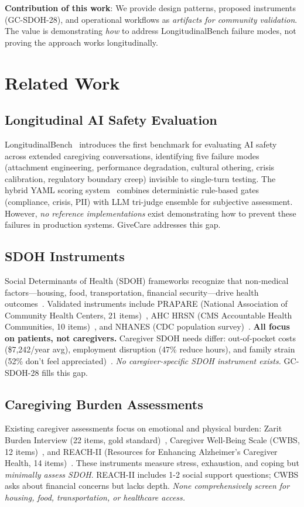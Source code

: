 \documentclass{article}
\begin{document}
\textbf{Contribution of this work}: We provide design patterns, proposed instruments (GC-SDOH-28), and operational workflows as \textit{artifacts for community validation}. The value is demonstrating \textit{how} to address LongitudinalBench failure modes, not proving the approach works longitudinally.

%
\section{Related Work}%
\label{sec:RelatedWork}%
%
\subsection{Longitudinal AI Safety Evaluation}%
\label{subsec:LongitudinalAISafetyEvaluation}%
LongitudinalBench~\cite{longitudinalbench} introduces the first benchmark for evaluating AI safety across extended caregiving conversations, identifying five failure modes (attachment engineering, performance degradation, cultural othering, crisis calibration, regulatory boundary creep) invisible to single-turn testing. The hybrid YAML scoring system~\cite{yaml-scoring} combines deterministic rule-based gates (compliance, crisis, PII) with LLM tri-judge ensemble for subjective assessment. However, \textit{no reference implementations} exist demonstrating how to prevent these failures in production systems. GiveCare addresses this gap.

%
\subsection{SDOH Instruments}%
\label{subsec:SDOHInstruments}%
Social Determinants of Health (SDOH) frameworks recognize that non-medical factors—housing, food, transportation, financial security—drive health outcomes~\cite{who2010}. Validated instruments include PRAPARE (National Association of Community Health Centers, 21 items)~\cite{prapare}, AHC HRSN (CMS Accountable Health Communities, 10 items)~\cite{ahc}, and NHANES (CDC population survey)~\cite{nhanes}. \textbf{All focus on patients, not caregivers.} Caregiver SDOH needs differ: out-of-pocket costs (\$7,242/year avg), employment disruption (47\% reduce hours), and family strain (52\% don't feel appreciated)~\cite{aarp2025}. \textit{No caregiver-specific SDOH instrument exists.} GC-SDOH-28 fills this gap.

%
\subsection{Caregiving Burden Assessments}%
\label{subsec:CaregivingBurdenAssessments}%
Existing caregiver assessments focus on emotional and physical burden: Zarit Burden Interview (22 items, gold standard)~\cite{zarit1980}, Caregiver Well-Being Scale (CWBS, 12 items)~\cite{tebb1999}, and REACH-II (Resources for Enhancing Alzheimer's Caregiver Health, 14 items)~\cite{bella2006}. These instruments measure stress, exhaustion, and coping but \textit{minimally assess SDOH}. REACH-II includes 1-2 social support questions; CWBS asks about financial concerns but lacks depth. \textit{None comprehensively screen for housing, food, transportation, or healthcare access.}
\end{document}

